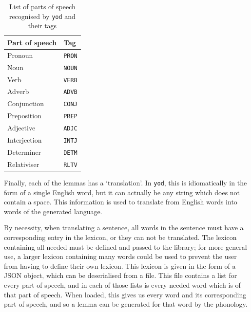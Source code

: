\documentclass{report}
\begin{document}
	\begin{table}
		\caption{List of parts of speech recognised by \texttt{yod} and their tags}
		\label{list of parts of speech}
		\centering
		\begin{tabular}{|l|l|} \hline
			\rowcolor[HTML]{D8D8D8} Part of speech & Tag  \\ \hline
			Pronoun        & \texttt{PRON} \\
			Noun           & \texttt{NOUN} \\
			Verb           & \texttt{VERB} \\
			Adverb         & \texttt{ADVB} \\
			Conjunction    & \texttt{CONJ} \\
			Preposition    & \texttt{PREP} \\
			Adjective      & \texttt{ADJC} \\
			Interjection   & \texttt{INTJ} \\
			Determiner     & \texttt{DETM} \\
			Relativiser    & \texttt{RLTV} \\ \hline
		\end{tabular}
	\end{table}
	
	Finally, each of the lemmas has a `translation'. In \texttt{yod}, this is idiomatically in the form of a single English word, but it can actually be any string which does not contain a space. This information is used to translate from English words into words of the generated language.
	
	By necessity, when translating a sentence, all words in the sentence must have a corresponding entry in the lexicon, or they can not be translated. The lexicon containing all needed must be defined and passed to the library; for more general use, a larger lexicon containing many words could be used to prevent the user from having to define their own lexicon. This lexicon is given in the form of a JSON object, which can be deserialised from a file. This file contains a list for every part of speech, and in each of those lists is every needed word which is of that part of speech. When loaded, this gives us every word and its corresponding part of speech, and so a lemma can be generated for that word by the phonology.
	
\end{document}
